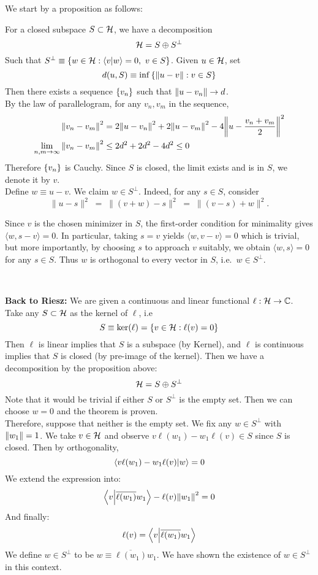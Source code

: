 \begin{prf}
We start by a proposition as follows: 
\begin{prop}{}
For a closed subspace $S\subset {\mathcal{H}}$, we have a decomposition
$${\mathcal{H}} = S \oplus S^\perp$$	
Such that $S^\perp \equiv \qty{w\in {\mathcal{H}}: \bra{v}\ket{w} = 0, \ v\in S}$. Given $u\in {\mathcal{H}}$, set
$$d(u, S) \equiv \inf \qty{\norm{u-v}: v\in S}$$
Then there exists a sequence $\qty{v_n}$ such that $\norm{u-v_n} \to d$. \\

By the law of parallelogram, for any $v_n, v_m$ in the sequence, 
\begin{align*}
	\norm{v_n-v_m}^2 &= 2\norm{u-v_n}^2 + 2\norm{u-v_m}^2 -  4\norm{u-\frac{v_n+v_m}{2}}^2\\
	\lim_{n, m\to \infty} \norm{v_n-v_m}^2 &\leq 2d^2 + 2d^2 - 4d^2 \leq 0
\end{align*}
Therefore $\qty{v_n}$ is Cauchy. Since $S$ is closed, the limit exists and is in $S$, we denote it by $v$.\\




Define $w \equiv u - v$. We claim $w \in S^\perp$. 
Indeed, for any $s \in S$, consider 
\[
   \|u - s\|^2 
   \;=\; \|(v + w) - s\|^2
   \;=\; \|(v - s) + w\|^2.
\]

Since $v$ is the chosen minimizer in $S$, the first-order condition for minimality gives 
\(\langle w, s-v\rangle = 0\). 
In particular, taking $s = v$ yields $\langle w, v-v\rangle=0$ which is trivial, 
but more importantly, by choosing $s$ to approach $v$ suitably, 
we obtain $\langle w, s\rangle = 0$ for any $s\in S$. Thus $w$ is orthogonal to every vector in $S$, i.e.\ $w \in S^\perp$.
\end{prop}\

\textbf{Back to Riesz:} We are given a continuous and linear functional $\ell: {\mathcal{H}} \to {\mathbb{C}}$. Take any $S\subset {\mathcal{H}}$ as the kernel of $\ell$, i.e
$$S \equiv \ker(\ell) = \qty{v\in {\mathcal{H}}: \ell(v)=0}$$ 
Then $\ell$ is linear implies that $S$ is a subspace (by Kernel), and $\ell$ is continuous implies that $S$ is closed (by pre-image of the kernel). Then we have a decomposition by the proposition above: 
$${\mathcal{H}} = S \oplus S^\perp$$
Note that it would be trivial if either $S$ or $S^\perp$ is the empty set. Then we can choose $w = 0$ and the theorem is proven. \\

Therefore, suppose that neither is the empty set. We fix any $w\in S^\perp$ with $\norm{w_1} =1$. We take $v\in {\mathcal{H}}$ and observe $v\ell(w_1) - w_1\ell(v)\in S$ since $S$ is closed. Then by orthogonality, 
$$\bra{v\ell(w_1) - w_1\ell(v)}\ket{w} = 0$$
We extend the expression into: 
$$\bra{v}\ket{\overline{\ell(w_1)}w_1} - \ell(v)\norm{w_1}^2 = 0$$
And finally: 
$$\ell(v) = \bra{v}\ket{\overline{\ell(w_1)}w_1}$$
We define $w\in S^\perp$ to be $w \equiv \overline{\ell(w_1)}w_1$. We have shown the existence of $w\in S^\perp$ in this context. \\


\end{prf}
